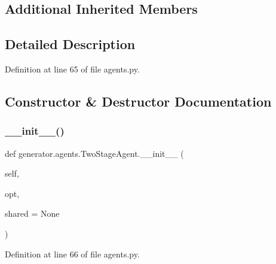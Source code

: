 \subsection*{Additional Inherited Members}


\subsection{Detailed Description}


Definition at line 65 of file agents.\+py.



\subsection{Constructor \& Destructor Documentation}
\mbox{\label{classgenerator_1_1agents_1_1TwoStageAgent_ac7d1af4e6371e79f58eb0449b557d87d}} 
\subsubsection{\texorpdfstring{\+\_\+\+\_\+init\+\_\+\+\_\+()}{\_\_init\_\_()}}
{\footnotesize\ttfamily def generator.\+agents.\+Two\+Stage\+Agent.\+\_\+\+\_\+init\+\_\+\+\_\+ (\begin{DoxyParamCaption}\item[{}]{self,  }\item[{}]{opt,  }\item[{}]{shared = {\ttfamily None} }\end{DoxyParamCaption})}



Definition at line 66 of file agents.\+py.



